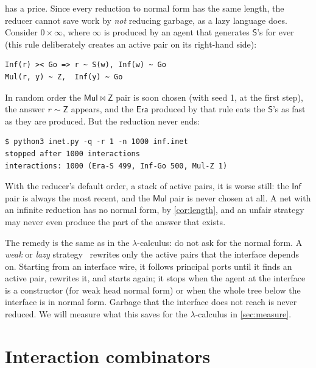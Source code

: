 \documentclass[11pt,a4paper]{article}
\newcommand{\ag}[1]{\mathsf{#1}}
\newcommand{\Z}{\ag{Z}}
\newcommand{\Sa}{\ag{S}}
\newcommand{\Mul}{\ag{Mul}}
\newcommand{\Era}{\ag{Era}}
\newcommand{\act}{\mathrel{\bowtie}}
\newcommand{\eqn}{\mathrel{\sim}}
\theoremstyle{definition}
\theoremstyle{plain}
\begin{document}
 has a price. Since every reduction to normal form has the
same length, the reducer cannot save work by \emph{not} reducing garbage, as
a lazy language does. Consider $0 \times \infty$, where $\infty$ is produced
by an agent that generates $\Sa$'s for ever (this rule deliberately creates
an active pair on its right-hand side):
\begin{lstlisting}
Inf(r) >< Go => r ~ S(w), Inf(w) ~ Go
Mul(r, y) ~ Z,  Inf(y) ~ Go
\end{lstlisting}
In random order the $\Mul\act\Z$ pair is soon chosen (with seed 1, at the
first step), the answer $r \eqn \Z$ appears, and the $\Era$ produced by that
rule eats the $\Sa$'s as fast as they are produced. But the reduction never ends:
\begin{lstlisting}[style=trace]
$ python3 inet.py -q -r 1 -n 1000 inf.inet
stopped after 1000 interactions
interactions: 1000 (Era-S 499, Inf-Go 500, Mul-Z 1)
\end{lstlisting}
With the reducer's default order, a stack of active pairs, it is worse still:
the $\ag{Inf}$ pair is always the most recent, and the $\Mul$ pair is never
chosen at all. A net with an infinite reduction has no normal form, by
\cref{cor:length}, and an unfair strategy may never even produce the part of
the answer that exists.

The remedy is the same as in the $\lambda$-calculus: do not ask for the normal
form. A \emph{weak} or \emph{lazy} strategy~\cite{fm99} rewrites only the active
pairs that the interface depends on. Starting from an interface wire, it
follows principal ports until it finds an active pair, rewrites it, and
starts again; it stops when the agent at the interface is a constructor (for
weak head normal form) or when the whole tree below the interface is in
normal form. Garbage that the interface does not reach is never reduced. We
will measure what this saves for the $\lambda$-calculus in
\cref{sec:measure}.

\section{Interaction combinators}\label{sec:combinators}
\end{document}
